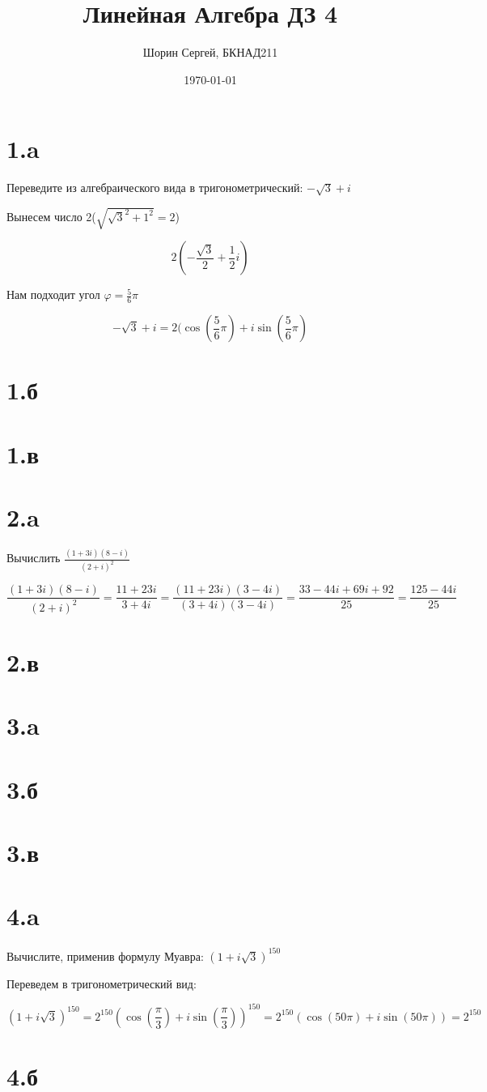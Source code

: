 \documentclass[a4paper]{article}
\author{Шорин Сергей, БКНАД211}
\title{Линейная Алгебра ДЗ 4}
\date{\today}
\begin{document}
\maketitle

\newpage

\section*{1.a}
Переведите из алгебраического вида в тригонометрический: $ -\sqrt{3} + i$

Вынесем число 2($ \sqrt{\sqrt{3}^2 + 1^2} = 2$)

$$2 ( -\frac{\sqrt{3}}{2} + \frac{1}{2}i)$$

Нам подходит угол $\varphi = \frac{5}{6} \pi$

$$ -\sqrt{3} + i = 2(\cos(\frac{5}{6} \pi) + i\sin(\frac{5}{6} \pi)$$



\section*{1.б}

\section*{1.в}

\section*{2.a}
Вычислить $\frac{(1 + 3i)(8 - i)}{(2 + i)^ 2}$

$$\frac{(1 + 3i)(8 - i)}{(2 + i)^ 2}= \frac{11 + 23i}{3 + 4i} = \frac{(11 + 23i)(3 - 4i)}{(3 + 4i)(3 - 4i)}= \frac{33 -44i + 69i + 92}{25} = \frac{125 -44i}{25}$$

\section*{2.в}

\section*{3.a}

\section*{3.б}

\section*{3.в}
\section*{4.a}
Вычислите, применив формулу Муавра: $(1 + i \sqrt{3})^{150}$

Переведем в тригонометрический вид:

$$(1 + i \sqrt{3})^{150} = 2^{150}(\cos(\frac{\pi}{3}) + i\sin(\frac{\pi}{3}))^{150} = 2^{150}(\cos(50\pi) + i\sin(50\pi)) = 2^{150}$$


\section*{4.б}
\end{document}
